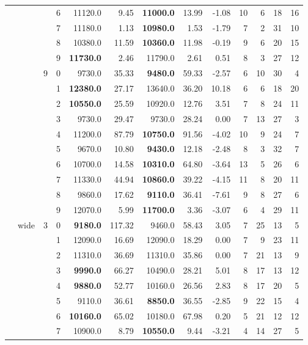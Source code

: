 {\begin{longtable}{llcc|rr|rrr|rrrr}
 &  &  & 6 & 11120.0 & 9.45 & \textbf{11000.0} & 13.99 & -1.08 & 10 & 6 & 18 & 16 \\
 &  &  & 7 & 11180.0 & 1.13 & \textbf{10980.0} & 1.53 & -1.79 & 7 & 2 & 31 & 10 \\
 &  &  & 8 & 10380.0 & 11.59 & \textbf{10360.0} & 11.98 & -0.19 & 9 & 6 & 20 & 15 \\
 &  &  & 9 & \textbf{11730.0} & 2.46 & 11790.0 & 2.61 & 0.51 & 8 & 3 & 27 & 12 \\ \hline
 &  & 9 & 0 & 9730.0 & 35.33 & \textbf{9480.0} & 59.33 & -2.57 & 6 & 10 & 30 & 4 \\
 &  &  & 1 & \textbf{12380.0} & 27.17 & 13640.0 & 36.20 & 10.18 & 6 & 6 & 18 & 20 \\
 &  &  & 2 & \textbf{10550.0} & 25.59 & 10920.0 & 12.76 & 3.51 & 7 & 8 & 24 & 11 \\
 &  &  & 3 & 9730.0 & 29.47 & 9730.0 & 28.24 & 0.00 & 7 & 13 & 27 & 3 \\
 &  &  & 4 & 11200.0 & 87.79 & \textbf{10750.0} & 91.56 & -4.02 & 10 & 9 & 24 & 7 \\
 &  &  & 5 & 9670.0 & 10.80 & \textbf{9430.0} & 12.18 & -2.48 & 8 & 3 & 32 & 7 \\
 &  &  & 6 & 10700.0 & 14.58 & \textbf{10310.0} & 64.80 & -3.64 & 13 & 5 & 26 & 6 \\
 &  &  & 7 & 11330.0 & 44.94 & \textbf{10860.0} & 39.22 & -4.15 & 11 & 8 & 20 & 11 \\
 &  &  & 8 & 9860.0 & 17.62 & \textbf{9110.0} & 36.41 & -7.61 & 9 & 8 & 27 & 6 \\
 &  &  & 9 & 12070.0 & 5.99 & \textbf{11700.0} & 3.36 & -3.07 & 6 & 4 & 29 & 11 \\ \hline
 & wide & 3 & 0 & \textbf{9180.0} & 117.32 & 9460.0 & 58.43 & 3.05 & 7 & 25 & 13 & 5 \\
 &  &  & 1 & 12090.0 & 16.69 & 12090.0 & 18.29 & 0.00 & 7 & 9 & 23 & 11 \\
 &  &  & 2 & 11310.0 & 36.69 & 11310.0 & 35.86 & 0.00 & 7 & 21 & 13 & 9 \\
 &  &  & 3 & \textbf{9990.0} & 66.27 & 10490.0 & 28.21 & 5.01 & 8 & 17 & 13 & 12 \\
 &  &  & 4 & \textbf{9880.0} & 52.77 & 10160.0 & 26.56 & 2.83 & 8 & 17 & 20 & 5 \\
 &  &  & 5 & 9110.0 & 36.61 & \textbf{8850.0} & 36.55 & -2.85 & 9 & 22 & 15 & 4 \\
 &  &  & 6 & \textbf{10160.0} & 65.02 & 10180.0 & 67.98 & 0.20 & 5 & 21 & 12 & 12 \\
 &  &  & 7 & 10900.0 & 8.79 & \textbf{10550.0} & 9.44 & -3.21 & 4 & 14 & 27 & 5 \\

\end{longtable}}
